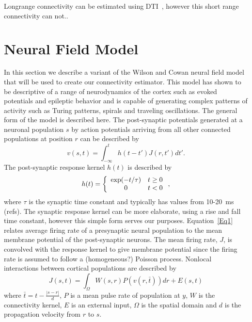 \documentclass[journal]{IEEEtran}
\begin{document}
Longrange connectivity can be estimated using DTI~\cite{Knock2009}, however this short range connectivity can not..

\section{Neural Field Model}
In this section we describe a variant of the  Wilson and Cowan neural field model~\cite{Wilson1973} that will be used to create our connectivity estimator. This model has shown to be descriptive of a range of neurodynamics of the cortex such as evoked potentials and epileptic behavior and is capable of generating complex patterns of activity such as Turing patterns, spirals and traveling oscillations. The general form of the model is described here. The post-synaptic potentials generated at a neuronal population $s$ by action potentials arriving from all other connected populations at position $r$ can be described by
\begin{equation}\label{Eq1}
v\left( {s,t} \right) = \int_{ - \infty }^t {h\left( {t - t'} \right)J\left( {r,t'} \right)dt'}.
\end{equation}
The post-synaptic response kernel $h(t)$ is described by
\begin{equation}\label{Eq2}
h(t) = \left\{ {\begin{array}{*{20}{c}}
   {\exp ( - {t \mathord{\left/
 {\vphantom {t \tau }} \right.
 \kern-\nulldelimiterspace} \tau })} & {t \ge 0}  \\
   0 & {t < 0}  \\
\end{array}} \right.,
\end{equation}
where $\tau$ is the synaptic time constant and typically has values from 10-20~ms (\textcolor[rgb]{1.00,0.00,0.00}{refs}). The synaptic response kernel can be more elaborate, using a rise and fall time constant, however this simple form serves our purposes. Equation~\ref{Eq1} relates average firing rate of a presynaptic neural population to the mean membrane potential of the post-synaptic neurons. The mean firing rate, $J$, is convolved with the response kernel to give membrane potential since the firing rate is assumed to follow a (homogeneous?) Poisson process. Nonlocal interactions between cortical populations are described by	
\begin{equation}\label{Eq3}
J\left( {s,t} \right) = \int_\Omega  {W\left( {s,r} \right)P\left( {v\left( {r,\bar t} \right)} \right)dr}  + E\left( {s,t} \right)
\end{equation}
where $\bar t = t - \frac{{\left| {s - r} \right|}}{d}$, $P$ is a mean pulse rate of population at $y$, $W$ is the connectivity kernel, $E$ is an external input, $\Omega$ is the spatial domain and $d$ is the propagation velocity from $r$ to $s$.
\end{document}
